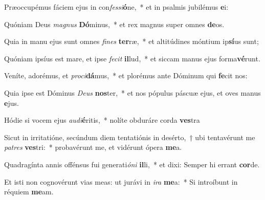 \item Præoccupémus fáciem ejus in con\textit{fes}\textit{si}\textbf{ó}ne,~* et in psalmis jubilémus \textbf{e}i:
\item Quóniam Deus \textit{ma}\textit{gnus} \textbf{Dó}minus,~* et rex magnus super omnes \textbf{de}os.
\item Quia in manu ejus sunt omnes \textit{fi}\textit{nes} \textbf{ter}ræ,~* et altitúdines móntium ip\textbf{sí}us sunt;
\item Quóniam ipsíus est mare, et ipse \textit{fe}\textit{cit} \textbf{il}lud,~* et siccam manus ejus forma\textbf{vé}runt.
\item Veníte, adorémus, et \textit{pro}\textit{ci}\textbf{dá}mus,~* et plorémus ante Dóminum qui \textbf{fe}cit nos:
\item Quia ipse est Dóminus \textit{De}\textit{us} \textbf{nos}ter,~* et nos pópulus páscuæ ejus, et oves manus \textbf{e}jus.
\item Hódie si vocem ejus \textit{au}\textit{di}\textbf{é}ritis,~* nolíte obduráre corda \textbf{ves}tra
\item Sicut in irritatióne, secúndum diem tentatiónis in desérto,~† ubi tentavérunt me \textit{pa}\textit{tres} \textbf{ves}tri:~* probavérunt me, et vidérunt ópera \textbf{me}a.
\item Quadragínta annis offénsus fui generati\textit{ó}\textit{ni} \textbf{il}li,~* et dixi: Semper hi errant \textbf{cor}de.
\item Et isti non cognovérunt vias meas: ut jurávi in \textit{i}\textit{ra} \textbf{me}a:~* Si introíbunt in réquiem \textbf{me}am.
